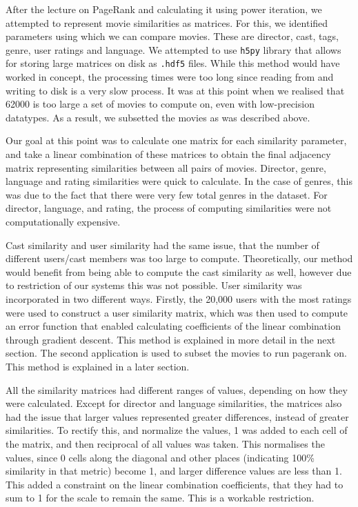 \documentclass[11pt]{article}
\begin{document}
After the lecture on PageRank and calculating it using power iteration,
we attempted to represent movie similarities as matrices. For this, we
identified parameters using which we can compare movies. These are
director, cast, tags, genre, user ratings and language. We attempted to
use \texttt{h5py} library that allows for storing large matrices on disk
as \texttt{.hdf5} files. While this method would have worked in concept,
the processing times were too long since reading from and writing to
disk is a very slow process. It was at this point when we realised that
62000 is too large a set of movies to compute on, even with
low-precision datatypes. As a result, we subsetted the movies as was
described above.

Our goal at this point was to calculate one matrix for each similarity
parameter, and take a linear combination of these matrices to obtain the
final adjacency matrix representing similarities between all pairs of
movies. Director, genre, language and rating similarities were quick to
calculate. In the case of genres, this was due to the fact that there
were very few total genres in the dataset. For director, language, and
rating, the process of computing similarities were not computationally
expensive.

Cast similarity and user similarity had the same issue, that the number
of different users/cast members was too large to compute. Theoretically,
our method would benefit from being able to compute the cast similarity
as well, however due to restriction of our systems this was not
possible. User similarity was incorporated in two different ways.
Firstly, the 20,000 users with the most ratings were used to construct a
user similarity matrix, which was then used to compute an error function
that enabled calculating coefficients of the linear combination through
gradient descent. This method is explained in more detail in the next
section. The second application is used to subset the movies to run
pagerank on. This method is explained in a later section.

All the similarity matrices had different ranges of values, depending on
how they were calculated. Except for director and language similarities,
the matrices also had the issue that larger values represented greater
differences, instead of greater similarities. To rectify this, and
normalize the values, 1 was added to each cell of the matrix, and then
reciprocal of all values was taken. This normalises the values, since 0
cells along the diagonal and other places (indicating 100\% similarity
in that metric) become 1, and larger difference values are less than 1.
This added a constraint on the linear combination coefficients, that
they had to sum to 1 for the scale to remain the same. This is a
workable restriction.
\end{document}
